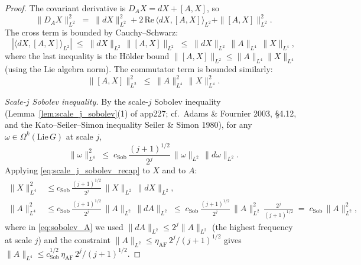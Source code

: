 \begin{proof}
The covariant derivative is $D_{A}X=dX+[A,X]$, so
\begin{equation}
\label{eq:covariant_split}
  \|D_{A}X\|_{L^{2}}^{2}
  \;=\;\|dX\|_{L^{2}}^{2}
  +2\,\mathrm{Re}\,\langle dX,[A,X]\rangle_{L^{2}}
  +\|[A,X]\|_{L^{2}}^{2}.
\end{equation}
The cross term is bounded by Cauchy--Schwarz:
\begin{equation}
\label{eq:cross_term_bound}
  |\langle dX,[A,X]\rangle_{L^{2}}|
  \;\le\;\|dX\|_{L^{2}}\,\|[A,X]\|_{L^{2}}
  \;\le\;\|dX\|_{L^{2}}\,\|A\|_{L^{4}}\,\|X\|_{L^{4}},
\end{equation}
where the last inequality is the H\"older bound
$\|[A,X]\|_{L^{2}}\le\|A\|_{L^{4}}\|X\|_{L^{4}}$ (using the
Lie algebra norm). The commutator term is bounded similarly:
\begin{equation}
\label{eq:commutator_term_bound}
  \|[A,X]\|_{L^{2}}^{2}
  \;\le\;\|A\|_{L^{4}}^{2}\,\|X\|_{L^{4}}^{2}.
\end{equation}

\emph{Scale-$j$ Sobolev inequality.} By the scale-$j$ Sobolev
inequality (Lemma~\ref{lem:scale_j_sobolev}(1) of app227;
cf.\ Adams \& Fournier 2003, \S 4.12, and the Kato--Seiler--Simon
inequality Seiler \& Simon 1980), for any $\omega\in
\Omega^{k}(\mathrm{Lie}\,G)$ at scale $j$,
\begin{equation}
\label{eq:scale_j_sobolev_recap}
  \|\omega\|_{L^{4}}^{2}
  \;\le\;c_{\mathrm{Sob}}\,\frac{(j+1)^{1/2}}{2^{j}}\,
  \|\omega\|_{L^{2}}\,\|d\omega\|_{L^{2}}.
\end{equation}
Applying \eqref{eq:scale_j_sobolev_recap} to $X$ and to $A$:
\begin{align}
\label{eq:sobolev_X}
  \|X\|_{L^{4}}^{2}
  &\le c_{\mathrm{Sob}}\,\frac{(j+1)^{1/2}}{2^{j}}\,
  \|X\|_{L^{2}}\,\|dX\|_{L^{2}},\\
\label{eq:sobolev_A}
  \|A\|_{L^{4}}^{2}
  &\le c_{\mathrm{Sob}}\,\frac{(j+1)^{1/2}}{2^{j}}\,
  \|A\|_{L^{2}}\,\|dA\|_{L^{2}}
  \;\le\;c_{\mathrm{Sob}}\,\frac{(j+1)^{1/2}}{2^{j}}\,
  \|A\|_{L^{2}}^{2}\,\frac{2^{j}}{(j+1)^{1/2}}
  \;=\;c_{\mathrm{Sob}}\,\|A\|_{L^{2}}^{2},
\end{align}
where in \eqref{eq:sobolev_A} we used
$\|dA\|_{L^{2}}\le 2^{j}\|A\|_{L^{2}}$ (the highest frequency at
scale $j$) and the constraint $\|A\|_{L^{2}}\le
\eta_{\mathrm{AF}}\,2^{j}/(j+1)^{1/2}$ gives
$\|A\|_{L^{4}}\le c_{\mathrm{Sob}}^{1/2}\,\eta_{\mathrm{AF}}\,
2^{j}/(j+1)^{1/2}$.


\end{proof}
